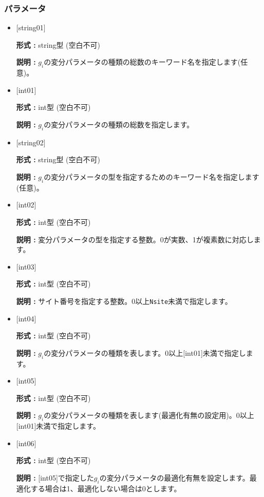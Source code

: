 \subsubsection{パラメータ}
 \begin{itemize}

   \item  $[$string01$]$
   
    {\bf 形式 :} string型 (空白不可)

   {\bf 説明 :} $g_i$の変分パラメータの種類の総数のキーワード名を指定します(任意)。

   \item  $[$int01$]$
   
    {\bf 形式 :} int型 (空白不可)

   {\bf 説明 :} $g_i$の変分パラメータの種類の総数を指定します。

   \item  $[$string02$]$
   
    {\bf 形式 :} string型 (空白不可)

   {\bf 説明 :} $g_i$の変分パラメータの型を指定するためのキーワード名を指定します(任意)。

  \item  $[$int02$]$
  
 {\bf 形式 :} int型 (空白不可)

{\bf 説明 :} 変分パラメータの型を指定する整数。0が実数、1が複素数に対応します。

  \item  $[$int03$]$
  
 {\bf 形式 :} int型 (空白不可)

{\bf 説明 :} サイト番号を指定する整数。0以上\verb|Nsite|{未満}で指定します。
 
 \item  $[$int04$]$
   
   {\bf 形式 :} int型 (空白不可)

  {\bf 説明 :} $g_i$の変分パラメータの種類を表します。0以上[int01]{未満}で指定します。

 \item  $[$int05$]$
   
   {\bf 形式 :} int型 (空白不可)

  {\bf 説明 :} $g_i$の変分パラメータの種類を表します(最適化有無の設定用)。0以上[int01]{未満}で指定します。

 \item  $[$int06$]$
   
   {\bf 形式 :} int型 (空白不可)

  {\bf 説明 :} [int05]で指定した$g_i$の変分パラメータの最適化有無を設定します。最適化する場合は1、最適化しない場合は0とします。
  
\end{itemize}

